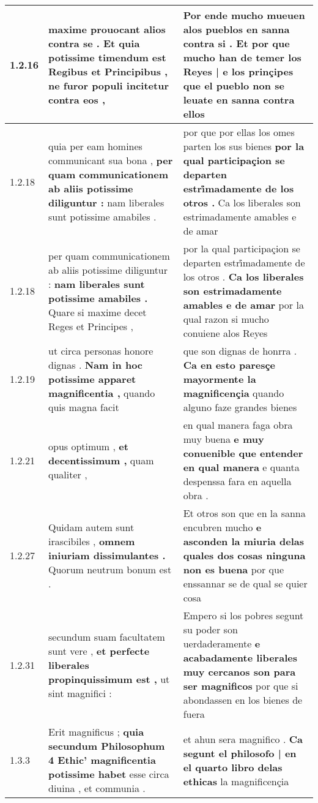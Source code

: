 \begin{tabular}{|p{1cm}|p{6.5cm}|p{6.5cm}|}
1.2.16 & maxime prouocant alios contra se . \textbf{ Et quia potissime timendum est Regibus et Principibus , } ne furor populi incitetur contra eos , & Por ende mucho mueuen alos pueblos en sanna contra si . \textbf{ Et por que mucho han de temer los Reyes | e los prinçipes } que el pueblo non se leuate en sanna contra ellos \\\hline
1.2.18 & quia per eam homines communicant sua bona , \textbf{ per quam communicationem ab aliis potissime diliguntur : } nam liberales sunt potissime amabiles . & por que por ellas los omes parten los sus bienes \textbf{ por la qual participaçion se departen estri̊madamente de los otros . } Ca los liberales son estrimadamente amables e de amar \\\hline
1.2.18 & per quam communicationem ab aliis potissime diliguntur : \textbf{ nam liberales sunt potissime amabiles . } Quare si maxime decet Reges et Principes , & por la qual participaçion se departen estri̊madamente de los otros . \textbf{ Ca los liberales son estrimadamente amables e de amar } por la qual razon si mucho conuiene alos Reyes \\\hline
1.2.19 & ut circa personas honore dignas . \textbf{ Nam in hoc potissime apparet magnificentia , } quando quis magna facit & que son dignas de honrra . \textbf{ Ca en esto paresçe mayormente la magnificençia } quando alguno faze grandes bienes \\\hline
1.2.21 & opus optimum , \textbf{ et decentissimum , } quam qualiter , & en qual manera faga obra muy buena \textbf{ e muy conuenible que entender en qual manera } e quanta despenssa fara en aquella obra . \\\hline
1.2.27 & Quidam autem sunt irascibiles , \textbf{ omnem iniuriam dissimulantes . } Quorum neutrum bonum est . & Et otros son que en la sanna encubren mucho \textbf{ e asconden la miuria delas quales dos cosas ninguna non es buena } por que enssannar se de qual se quier cosa \\\hline
1.2.31 & secundum suam facultatem sunt vere , \textbf{ et perfecte liberales propinquissimum est , } ut sint magnifici : & Empero si los pobres segunt su poder son uerdaderamente \textbf{ e acabadamente liberales muy cercanos son para ser magnificos } por que si abondassen en los bienes de fuera \\\hline
1.3.3 & Erit magnificus ; \textbf{ quia secundum Philosophum 4 Ethic’ magnificentia potissime habet } esse circa diuina , et communia . & et ahun sera magnifico . \textbf{ Ca segunt el philosofo | en el quarto libro delas ethicas } la magnificençia \\\hline

\end{tabular}
